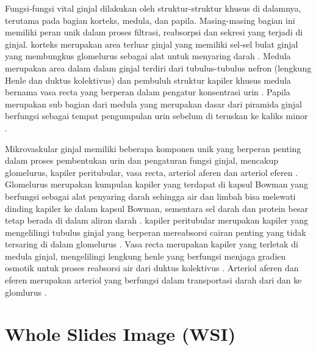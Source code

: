 \noindent Fungsi-fungsi vital ginjal dilakukan oleh struktur-struktur khusus di dalamnya, terutama pada bagian korteks, medula, dan papila. Masing-masing bagian ini memiliki peran unik dalam proses filtrasi, reabsorpsi dan sekresi yang terjadi di ginjal. korteks merupakan area terluar ginjal yang memiliki sel-sel bulat ginjal yang membungkus glomelurus sebagai alat untuk menyaring darah \cite{gopalan_renal_2022,mescher_junqueiras_2021}. Medula merupakan area dalam dalam ginjal terdiri dari tubulus-tubulus nefron (lengkung Henle dan duktus kolektivus) dan pembuluh struktur kapiler khusus medula bernama vasa recta yang berperan dalam pengatur konsentrasi urin \cite{haug_multi-omic_2022}. Papila merupakan sub bagian dari medula yang merupakan dasar dari piramida ginjal berfungsi sebagai tempat pengumpulan urin sebelum di teruskan ke kaliks minor \cite{sabate_arroyo_relationship_2020}.

\noindent Mikrovaskular ginjal memiliki beberapa komponen unik yang berperan penting dalam proses pembentukan urin dan pengaturan fungsi ginjal, mencakup glomelurus, kapiler peritubular, vasa recta, arteriol aferen dan arteriol eferen \cite{mescher_junqueiras_2021}. Glomelurus merupakan kumpulan kapiler yang terdapat di kapsul Bowman yang berfungsi sebagai alat penyaring darah sehingga air dan limbah bisa melewati dinding kapiler ke dalam kapsul Bowman, sementara sel darah dan protein besar tetap berada di dalam aliran darah \cite{luxen_unique_2023}. kapiler peritubular merupakan kapiler yang mengelilingi tubulus ginjal yang berperan mereabsorsi cairan penting yang tidak tersaring di dalam glomelurus \cite{savedchuk_targeting_2023}. Vasa recta merupakan kapiler yang terletak di medula ginjal, mengelilingi  lengkung henle yang berfungsi menjaga gradien osmotik untuk proses reabsorsi air dari duktus kolektivus \cite{goligorsky_emerging_2022}. Arteriol aferen dan eferen merupakan arteriol  yang berfungsi dalam transportasi darah dari dan ke glomlurus \cite{ergin_kidney_2021}.


\section{Whole Slides Image (WSI)}

